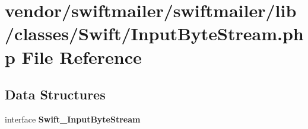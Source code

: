 \section{vendor/swiftmailer/swiftmailer/lib/classes/\+Swift/\+Input\+Byte\+Stream.php File Reference}
\label{_input_byte_stream_8php}
\subsection*{Data Structures}
\begin{DoxyCompactItemize}
\item 
interface {\bf Swift\+\_\+\+Input\+Byte\+Stream}
\end{DoxyCompactItemize}
